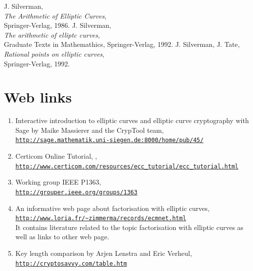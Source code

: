 \begin{thebibliography}{99999}
     J. Silverman, 
        \\
        {\em The Arithmetic of Elliptic Curves},\\
	Springer-Verlag, 1986.
    J. Silverman,
	 \\
        {\em The arithmetic of elliptc curves},\\
	Graduate Texts in Mathemathics, Springer-Verlag, 1992.
    J. Silverman, J. Tate,
	 \\
        {\em Rational points on elliptic curves},\\
	Springer-Verlag, 1992.

\end{thebibliography}

\section*{Web links}

\begin{enumerate}
   \item Interactive introduction to elliptic curves and elliptic curve cryptography
         with Sage by Maike Massierer and the CrypTool team,\\
         \href{http://sage.mathematik.uni-siegen.de:8000/home/pub/45/}
      {\texttt{http://sage.mathematik.uni-siegen.de:8000/home/pub/45/}}

   \item Certicom Online Tutorial, ,\\
         \href{http://www.certicom.com/resources/ecc_tutorial/ecc_tutorial.html}
      {\texttt{http://www.certicom.com/resources/ecc\_tutorial/ecc\_tutorial.html}}
		
   \item Working group IEEE P1363, \\
         \href{http://grouper.ieee.org/groups/1363}
      {\texttt{http://grouper.ieee.org/groups/1363}}

   \item \hypertarget{Lenstra2}{}
         An informative web page about factorisation with elliptic curves, \\
         \href{http://www.loria.fr/~zimmerma/records/ecmnet.html}
	 {\texttt{http://www.loria.fr/\~{}zimmerma/records/ecmnet.html}} \\
         It contains literature related to the topic factorisation with 
	 elliptic curves as well as links to other web page. 

   \item Key length comparison by Arjen Lenstra and Eric Verheul,\\
         \href{http://cryptosavvy.com/table.htm}
      {\texttt{http://cryptosavvy.com/table.htm}}

\end{enumerate}



